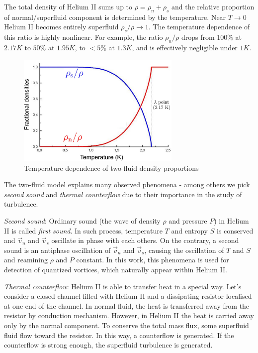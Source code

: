 	The total density of Helium II sums up to $\rho = \rho_n + \rho_s$ and the relative proportion of normal/superfluid component is determined by the temperature. Near $T \rightarrow 0$ Helium II becomes entirely superfluid $\rho_s/\rho \rightarrow 1$. The temperature dependence of this ratio is highly nonlinear. For example, the ratio $\rho_n/\rho$ drops from $100\%$ at $2.17\unit{K}$ to $50\%$ at $1.95\unit{K}$, to $<5\%$ at $1.3\unit{K}$, and is effectively negligible under $1\unit{K}$.

	\begin{figure}[h]
		\centering
		\includegraphics[width=0.7\textwidth]{graphics/theory/densities}
		\caption{Temperature dependence of two-fluid density proportions}
		\label{densities}
	\end{figure}

	The two-fluid model explains many observed phenomena - among others we pick \textit{second sound} and \textit{thermal counterflow} due to their importance in the study of turbulence.

	\textit{Second sound}: Ordinary sound (the wave of density $\rho$ and pressure $P$) in Helium II is called \textit{first sound}. In such process, temperature $T$ and entropy $S$ is conserved and $\vec{v}_n$ and $\vec{v}_s$ oscillate in phase with each others. On the contrary, a second sound is an antiphase oscillation of $\vec{v}_n$ and $\vec{v}_s$, causing the oscillation of $T$ and $S$ and reamining $\rho$ and $P$ constant. In this work, this phenomena is used for detection of quantized vortices, which naturally appear within Helium II.

	\textit{Thermal counterflow}: Helium II is able to transfer heat in a special way. Let's consider a closed channel filled with Helium II and a dissipating resistor localised at one end of the channel. In normal fluid, the heat is transferred away from the resistor by conduction mechanism. However, in Helium II the heat is carried away only by the normal component. To conserve the total mass flux, some superfluid fluid flow toward the resistor. In this way, a counterflow is generated. If the counterflow is strong enough, the superfluid turbulence is generated.

